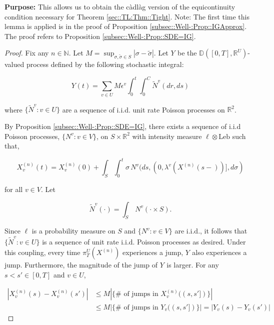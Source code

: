 \documentclass[12pt]{article}
\newcommand{\mb}{\mathbb}
\newcommand{\te}{\text}
\newcommand{\ep}{\epsilon}
\newcommand{\purpose}{\textbf{Purpose: }}
\newcommand{\ind}{\hspace{24pt}}
\newcommand{\cad}{\mb{D}}							%
\renewcommand{\v}{v}							%
\renewcommand{\U}{U}							%
\renewcommand{\S}{S}							%
\newcommand{\s}{\sigma}							%
\newcommand{\ev}{\ep}							%
\newcommand{\T}{T}								%
\renewcommand{\t}{t}							%
\newcommand{\proj}{\pi}							%
\renewcommand{\tt}{s}							%
\newcommand{\ttt}{s'}							%
\newcommand{\X}{X}								%
\newcommand{\vind}[1]{^{#1}}					%
\newcommand{\vsi}[1]{^{#1}}						%
\newcommand{\cind}[1]{_{#1}}					%
\newcommand{\tp}[1]{(#1)}						%
\newcommand{\tip}[1]{#1}						%
\newcommand{\ts}[1]{_{#1}}						%
\newcommand{\const}{C}							%
\newcommand{\sln}[1]{^{(#1)}}					%
\renewcommand{\ss}{\tilde{\s}}					%
\newcommand{\poiss}{N}							%
\newcommand{\leb}{\te{Leb}}						%
\newcommand{\Sm}{\ell}							%
\newcommand{\rate}{\lambda}						%
\renewcommand{\r}{r}							%
\newcommand{\cconst}{M}							%
\newcommand{\alt}[1]{\widetilde{#1}}			%
\newcommand{\indx}[1]{_{#1}}					%
\newcommand{\XX}{Y}								%
\begin{document}
\purpose This allows us to obtain the c\`adl\`ag version of the equicontinuity condition necessary for Theorem \ref{sec::TL:Thm::Tight}. Note: The first time this lemma is applied is in the proof of Proposition \ref{subsec::Well-:Prop::IGApprox}. The proof refers to Proposition \ref{subsec::Well-:Prop::SDE=IG}.

\begin{proof}
Fix any \(n \in \mb{N}\). Let \(\cconst = \sup_{\s,\ss \in \S} |\s - \ss|\). Let \(\XX\cind{}\tip{}\) be the \(\cad([0,\T],\mb{R}^\U)\)-valued process defined by the following stochastic integral:

\[\XX\cind{}\tp{\t} = \sum_{\v \in \U}\cconst\ev\vind{\v}\int_0^\t\int_0^{\const\indx{}}\alt{\poiss}\vind{\v}(d\r, d\tt)\]

where \(\{\alt{\poiss}\vind{\v}:\v \in \U\}\) are a sequence of i.i.d. unit rate Poisson processes on \(\mb{R}^2\). 

\ind By Proposition \ref{subsec::Well-:Prop::SDE=IG}, there exists a sequence of i.i.d Poisson processes, \(\{\poiss\vind{\v}:\v\in V\}\), on \(\S\times\mb{R}^2\) with intensity measure \(\Sm\otimes \leb\) such that,

\[\X\sln{n}\cind{\v}\tp{\t} = \X\sln{n}\cind{\v}\tp{0} + \int_\S\int_0^\t \s\,\poiss\vind{\v}(d\tt,(0,\rate\vind{\v}(\X\sln{n}\cind{}\tp{\tt-})],d\s)\]

for all \(\v\in V\). Let

\[\alt{\poiss}\vind{\v}(\cdot) = \int_\S\,\poiss\vind{\v}(\cdot\times \S).\]

Since \(\Sm\) is a probability measure on \(\S\) and \(\{\poiss\vind{\v}:\v\in V\}\) are i.i.d., it follows that \(\{\alt{\poiss}\vind{\v}:\v\in \U\}\) is a sequence of unit rate i.i.d. Poisson processes as desired. Under this coupling, every time \(\proj\vsi{\U}\ts{\T}(\X\sln{n}\cind{}\tip{})\) experiences a jump, \(\XX\cind{}\tip{}\) also experiences a jump. Furthermore, the magnitude of the jump of \(\XX\cind{}\tip{}\) is larger. For any \(\tt<\ttt\in [0,\T]\) and \(\v\in \U\),

\begin{align*}
|\X\sln{n}\cind{\v}\tp{\tt} - \X\sln{n}\cind{\v}\tp{\ttt}|&\leq \cconst\left|\{\#\te{ of jumps in }\X\sln{n}\cind{\v}\tp{(\tt,\ttt]}\}\right| \\
&\leq \cconst\left|\{\#\te{ of jumps in }\XX\cind{\v}\tp{(\tt,\ttt]}\}\right| = \left|\XX\cind{\v}\tp{\tt} - \XX\cind{\v}\tp{\ttt}\right|
\end{align*}


\end{proof}
\end{document}
